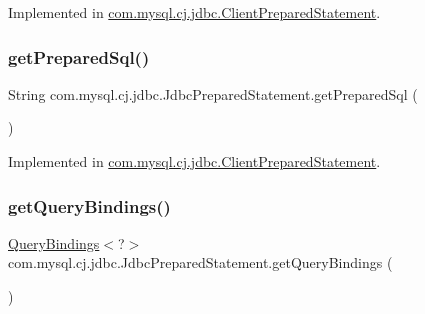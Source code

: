 Implemented in \mbox{\hyperlink{classcom_1_1mysql_1_1cj_1_1jdbc_1_1_client_prepared_statement_a0983ede42add411efe5197093530698a}{com.\+mysql.\+cj.\+jdbc.\+Client\+Prepared\+Statement}}.

\mbox{\label{interfacecom_1_1mysql_1_1cj_1_1jdbc_1_1_jdbc_prepared_statement_a20618e9a216f90d8366fd7e931783dda}} 
\subsubsection{\texorpdfstring{get\+Prepared\+Sql()}{getPreparedSql()}}
{\footnotesize\ttfamily String com.\+mysql.\+cj.\+jdbc.\+Jdbc\+Prepared\+Statement.\+get\+Prepared\+Sql (\begin{DoxyParamCaption}{ }\end{DoxyParamCaption})}



Implemented in \mbox{\hyperlink{classcom_1_1mysql_1_1cj_1_1jdbc_1_1_client_prepared_statement_aa34204b558f5f8eeec0764fbc44ef7bf}{com.\+mysql.\+cj.\+jdbc.\+Client\+Prepared\+Statement}}.

\mbox{\label{interfacecom_1_1mysql_1_1cj_1_1jdbc_1_1_jdbc_prepared_statement_a1d95958c32c8174c267e3d91e7371a13}} 
\subsubsection{\texorpdfstring{get\+Query\+Bindings()}{getQueryBindings()}}
{\footnotesize\ttfamily \mbox{\hyperlink{interfacecom_1_1mysql_1_1cj_1_1_query_bindings}{Query\+Bindings}}$<$?$>$ com.\+mysql.\+cj.\+jdbc.\+Jdbc\+Prepared\+Statement.\+get\+Query\+Bindings (\begin{DoxyParamCaption}{ }\end{DoxyParamCaption})}



